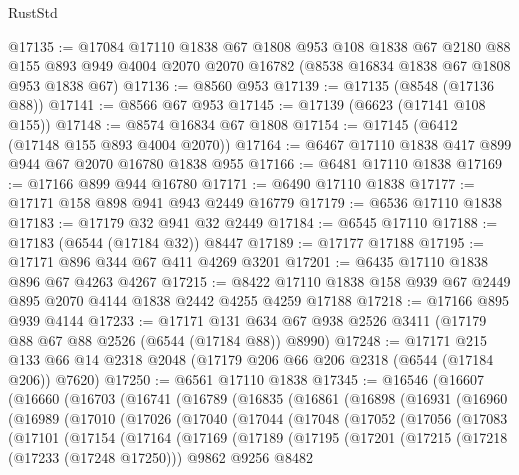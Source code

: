 \begin{lexlean}{RustStd}
\begin{coremodule}
@17135 := @17084
    @17110
    @1838
    @67
    @1808
    @953
    @108
    @1838
    @67
    @2180
    @88
    @155
    @893
    @949
    @4004
    @2070
    @2070
    @16782
    (@8538 @16834 @1838 @67 @1808 @953 @1838 @67)
@17136 := @8560 @953
@17139 := @17135 (@8548 (@17136 @88))
@17141 := @8566 @67 @953
@17145 := @17139 (@6623 (@17141 @108 @155))
@17148 := @8574 @16834 @67 @1808
@17154 := @17145 (@6412 (@17148 @155 @893 @4004 @2070))
@17164 := @6467 @17110 @1838 @417 @899 @944 @67 @2070 @16780 @1838 @955
@17166 := @6481 @17110 @1838
@17169 := @17166 @899 @944 @16780
@17171 := @6490 @17110 @1838
@17177 := @17171 @158 @898 @941 @943 @2449 @16779
@17179 := @6536 @17110 @1838
@17183 := @17179 @32 @941 @32 @2449
@17184 := @6545 @17110
@17188 := @17183 (@6544 (@17184 @32)) @8447
@17189 := @17177 @17188
@17195 := @17171 @896 @344 @67 @411 @4269 @3201
@17201 := @6435 @17110 @1838 @896 @67 @4263 @4267
@17215 := @8422 @17110 @1838 @158 @939 @67 @2449 @895 @2070 @4144 @1838 @2442 @4255 @4259 @17188
@17218 := @17166 @895 @939 @4144
@17233 := @17171
    @131
    @634
    @67
    @938
    @2526
    @3411
    (@17179 @88 @67 @88 @2526 (@6544 (@17184 @88)) @8990)
@17248 := @17171
    @215
    @133
    @66
    @14
    @2318
    @2048
    (@17179 @206 @66 @206 @2318 (@6544 (@17184 @206)) @7620)
@17250 := @6561 @17110 @1838
@17345 := @16546
    (@16607
      (@16660
        (@16703
          (@16741
            (@16789
              (@16835
                (@16861
                  (@16898
                    (@16931
                      (@16960
                        (@16989
                          (@17010
                            (@17026
                              (@17040
                                (@17044
                                  (@17048
                                    (@17052
                                      (@17056
                                        (@17083
                                          (@17101
                                            (@17154
                                              (@17164
                                                (@17169
                                                  (@17189
                                                    (@17195
                                                      (@17201
                                                        (@17215
                                                          (@17218 (@17233 (@17248 @17250)))
                                                          @9862
                                                          @9256
                                                          @8482

\end{coremodule}
\end{lexlean}
